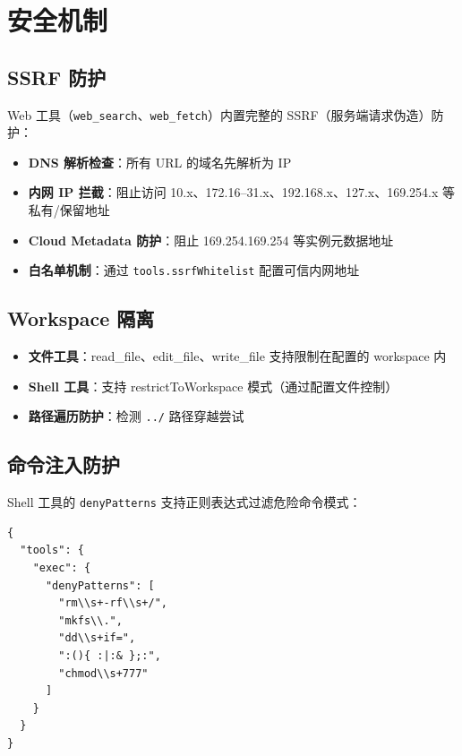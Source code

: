 \documentclass[12pt,a4paper,UTF8]{ctexart}
\begin{document}
\chapter{安全机制}

\section{SSRF 防护}

Web 工具（\texttt{web\_search}、\texttt{web\_fetch}）内置完整的 SSRF（服务端请求伪造）防护：

\begin{itemize}
    \item \textbf{DNS 解析检查}：所有 URL 的域名先解析为 IP
    \item \textbf{内网 IP 拦截}：阻止访问 10.x、172.16–31.x、192.168.x、127.x、169.254.x 等私有/保留地址
    \item \textbf{Cloud Metadata 防护}：阻止 169.254.169.254 等实例元数据地址
    \item \textbf{白名单机制}：通过 \texttt{tools.ssrfWhitelist} 配置可信内网地址
\end{itemize}

\section{Workspace 隔离}

\begin{itemize}
    \item \textbf{文件工具}：read\_file、edit\_file、write\_file 支持限制在配置的 workspace 内
    \item \textbf{Shell 工具}：支持 restrictToWorkspace 模式（通过配置文件控制）
    \item \textbf{路径遍历防护}：检测 \texttt{../} 路径穿越尝试
\end{itemize}

\section{命令注入防护}

Shell 工具的 \texttt{denyPatterns} 支持正则表达式过滤危险命令模式：

\begin{verbatim}
{
  "tools": {
    "exec": {
      "denyPatterns": [
        "rm\\s+-rf\\s+/",
        "mkfs\\.",
        "dd\\s+if=",
        ":(){ :|:& };:",
        "chmod\\s+777"
      ]
    }
  }
}
\end{verbatim}
\end{document}
